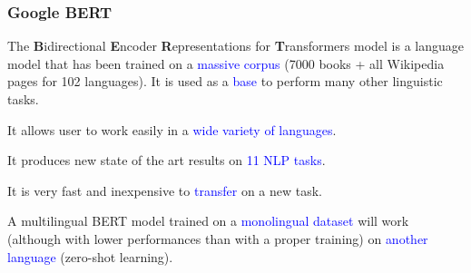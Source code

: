\documentclass[9pt]{beamer}
\begin{document}
\begin{frame}
  \frametitle{Google BERT}

  The \textbf{B}idirectional \textbf{E}ncoder \textbf{R}epresentations
  for \textbf{T}ransformers model is a language model that has been
  trained on a \textcolor{blue}{massive corpus} (7000 books + all
  Wikipedia pages for 102 languages). It is used as a
  \textcolor{blue}{base} to perform many other linguistic tasks.

  \bigskip

  It allows user to work easily in a \textcolor{blue}{wide variety of
    languages}.

  \bigskip

  It produces new state of the art results on \textcolor{blue}{11 NLP
    tasks}.

  \bigskip

  It is very fast and inexpensive to \textcolor{blue}{transfer} on a
  new task.

  \bigskip

  A multilingual BERT model trained on a \textcolor{blue}{monolingual
    dataset} will work (although with lower performances than with a
  proper training) on \textcolor{blue}{another language} (zero-shot
  learning).
\end{frame}
\end{document}
